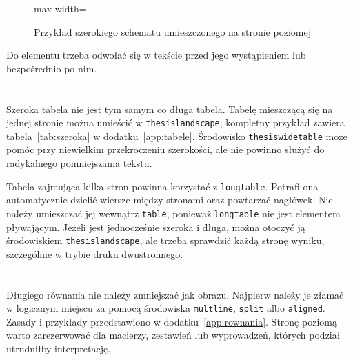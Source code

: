 \begin{thesislandscape}
\begin{figure}[p]
\begin{adjustbox}{max width=\linewidth}
  \end{adjustbox}
  \caption{Przykład szerokiego schematu umieszczonego na stronie poziomej}
  \label{fig:architektura-pozioma}
\end{figure}
\end{thesislandscape}

Do elementu trzeba odwołać się w tekście przed jego wystąpieniem lub bezpośrednio po nim.

\section{}

Szeroka tabela nie jest tym samym co długa tabela. Tabelę mieszczącą się na jednej stronie można umieścić w \texttt{thesislandscape}; kompletny przykład zawiera tabela~\ref{tab:szeroka} w dodatku~\ref{app:tabele}. Środowisko \texttt{thesiswidetable} może pomóc przy niewielkim przekroczeniu szerokości, ale nie powinno służyć do radykalnego pomniejszania tekstu.

Tabela zajmująca kilka stron powinna korzystać z \texttt{longtable}. Potrafi ona automatycznie dzielić wiersze między stronami oraz powtarzać nagłówek. Nie należy umieszczać jej wewnątrz \texttt{table}, ponieważ \texttt{longtable} nie jest elementem pływającym. Jeżeli jest jednocześnie szeroka i długa, można otoczyć ją środowiskiem \texttt{thesislandscape}, ale trzeba sprawdzić każdą stronę wyniku, szczególnie w trybie druku dwustronnego.

\section{}

Długiego równania nie należy zmniejszać jak obrazu. Najpierw należy je złamać w logicznym miejscu za pomocą środowiska \texttt{multline}, \texttt{split} albo \texttt{aligned}. Zasady i przykłady przedstawiono w dodatku~\ref{app:rownania}. Stronę poziomą warto zarezerwować dla macierzy, zestawień lub wyprowadzeń, których podział utrudniłby interpretację.

